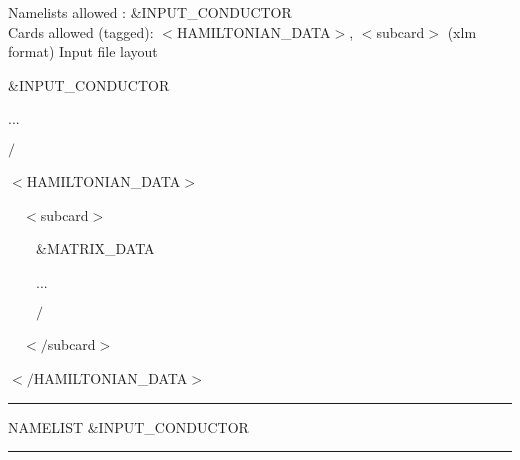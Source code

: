 \noindent Namelists allowed : \&INPUT\_CONDUCTOR\\
\noindent Cards allowed (tagged): $<$HAMILTONIAN\_DATA$>$, $<$subcard$>$ (xlm format)
\noindent Input file layout
\begin{description}
  \item \&INPUT\_CONDUCTOR
  \item ...
  \item $/$
  \item $<$HAMILTONIAN\_DATA$>$
  \item $\textrm{}\quad<$subcard$>$
  \item $\textrm{}\qquad$\&MATRIX\_DATA
  \item $\textrm{}\qquad$...
  \item $\textrm{}\qquad /$
  \item $\textrm{}\quad</$subcard$>$
  \item $</$HAMILTONIAN\_DATA$>$
\end{description}

\begin{centering}
\rule{2.2in}{0.01in} NAMELIST \&INPUT\_CONDUCTOR \rule{2.2in}{0.01in}
\end{centering}\\

